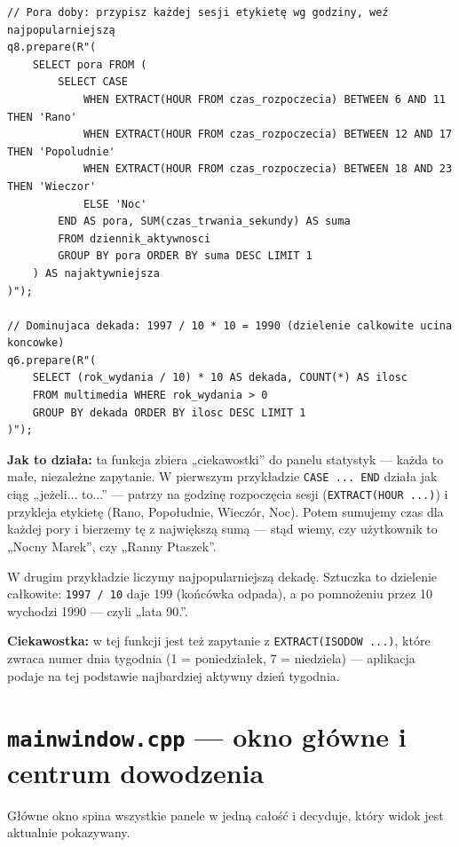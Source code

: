\documentclass[11pt,a4paper]{article}
\begin{document}
\begin{lstlisting}[caption={Pora doby i dominująca dekada}]
// Pora doby: przypisz każdej sesji etykietę wg godziny, weź najpopularniejszą
q8.prepare(R"(
    SELECT pora FROM (
        SELECT CASE
            WHEN EXTRACT(HOUR FROM czas_rozpoczecia) BETWEEN 6 AND 11  THEN 'Rano'
            WHEN EXTRACT(HOUR FROM czas_rozpoczecia) BETWEEN 12 AND 17 THEN 'Popoludnie'
            WHEN EXTRACT(HOUR FROM czas_rozpoczecia) BETWEEN 18 AND 23 THEN 'Wieczor'
            ELSE 'Noc'
        END AS pora, SUM(czas_trwania_sekundy) AS suma
        FROM dziennik_aktywnosci
        GROUP BY pora ORDER BY suma DESC LIMIT 1
    ) AS najaktywniejsza
)");

// Dominujaca dekada: 1997 / 10 * 10 = 1990 (dzielenie calkowite ucina koncowke)
q6.prepare(R"(
    SELECT (rok_wydania / 10) * 10 AS dekada, COUNT(*) AS ilosc
    FROM multimedia WHERE rok_wydania > 0
    GROUP BY dekada ORDER BY ilosc DESC LIMIT 1
)");
\end{lstlisting}

\textbf{Jak to działa:} ta funkcja zbiera „ciekawostki” do panelu statystyk ---
każda to małe, niezależne zapytanie. W pierwszym przykładzie \texttt{CASE ... END}
działa jak ciąg „jeżeli... to...” --- patrzy na godzinę rozpoczęcia sesji
(\texttt{EXTRACT(HOUR ...)}) i przykleja etykietę (Rano, Popołudnie, Wieczór, Noc).
Potem sumujemy czas dla każdej pory i bierzemy tę z największą sumą --- stąd wiemy,
czy użytkownik to „Nocny Marek”, czy „Ranny Ptaszek”.

W drugim przykładzie liczymy najpopularniejszą dekadę. Sztuczka to dzielenie
całkowite: \texttt{1997 / 10} daje 199 (końcówka odpada), a po pomnożeniu przez 10
wychodzi 1990 --- czyli „lata 90.”.

\textbf{Ciekawostka:} w tej funkcji jest też zapytanie z \texttt{EXTRACT(ISODOW ...)},
które zwraca numer dnia tygodnia (1 = poniedziałek, 7 = niedziela) --- aplikacja
podaje na tej podstawie najbardziej aktywny dzień tygodnia.

\section{\texttt{mainwindow.cpp} --- okno główne i centrum dowodzenia}

Główne okno spina wszystkie panele w jedną całość i decyduje, który widok jest
aktualnie pokazywany.
\end{document}
